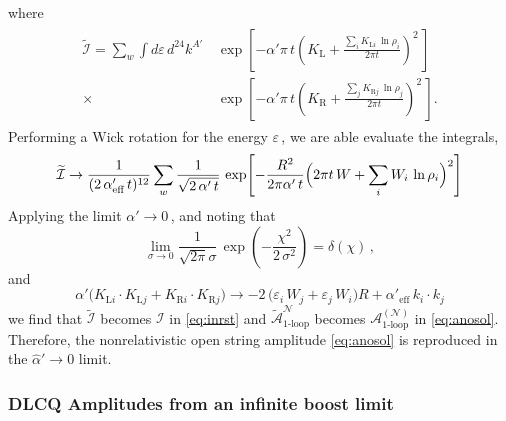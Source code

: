 \documentclass[11pt]{article}
\newcommand{\be}{\begin{equation}}
\newcommand{\ee}{\end{equation}}
\newcommand{\CA}{\mathcal{A}}
\newcommand{\CI}{\mathcal{I}}
\newcommand{\CN}{\mathcal{N}}
\newcommand{\lr}{\left (}
\newcommand{\rr}{\right )}
\newcommand{\ls}{\left [}
\newcommand{\rs}{\right ]}
\renewcommand{\tilde}[1]{\widetilde{#1}}
\begin{document}
%
where
%
\begin{align} \label{eq:ip}
\begin{split}
    \tilde{\CI} = \sum_w \int d\varepsilon \, d^{24} k^{A'} \, & \exp \ls - \alpha' \pi \, t \lr K_\text{L} + \frac{\sum_i K_{\text{L}i} \, \ln \rho_i}{2\pi t} \rr^{\!2} \, \rs \\[2pt]
    \times & \exp \ls - \alpha' \pi \, t \lr K_\text{R} + \frac{\sum_j K_{\text{R}j} \, \ln \rho_j}{2\pi t} \rr^{\!2} \, \rs.
\end{split}
\end{align}
%
Performing a Wick rotation for the energy $\varepsilon$\,, we are able evaluate the integrals,
%
\be
    \tilde{\CI} \rightarrow \frac{1}{(2\,\alpha'_\text{eff}\,t)^{12}} \sum_w \frac{1}{\sqrt{2 \, \alpha' \, t}} \, \exp \! \ls - \frac{R^2}{{2\pi \alpha'} \, t} \Bigl( 2\pi t \, W + \sum_i W_i \, \ln \rho_i \Bigr)^{2} \rs
\ee
%
Applying the limit $\alpha' \rightarrow 0$\,, and noting that
%
\be \label{eq:sigmazero}
    \lim_{\sigma \rightarrow 0} \frac{1}{\sqrt{2\pi} \sigma} \, \exp \lr - \frac{\chi^2}{2 \, \sigma^2} \rr = \delta ( \chi )\,,
\ee
%
and
%
\be
    \alpha' \bigl( K_{\text{L}i} \cdot K_{\text{L}j} + K_{\text{R}i} \cdot K_{\text{R}j} \bigr) \rightarrow - 2 \, \bigl( \varepsilon_i \, W_j + \varepsilon_j \, W_i\bigr) R + \alpha'_\text{eff} \, k_{i} \cdot k_{j}
\ee
%
we find that $\tilde{\CI}$ becomes $\CI$ in \eqref{eq:inrst} and $\tilde{\CA}^{\CN}_\text{1-loop}$ becomes $\CA_\text{1-loop}^{(\CN)}$ in \eqref{eq:anosol}.
%
Therefore, the nonrelativistic open string amplitude \eqref{eq:anosol} is reproduced in the $\hat{\alpha}' \rightarrow 0$ limit.  

\subsubsection*{DLCQ Amplitudes from an infinite boost limit}
\end{document}

